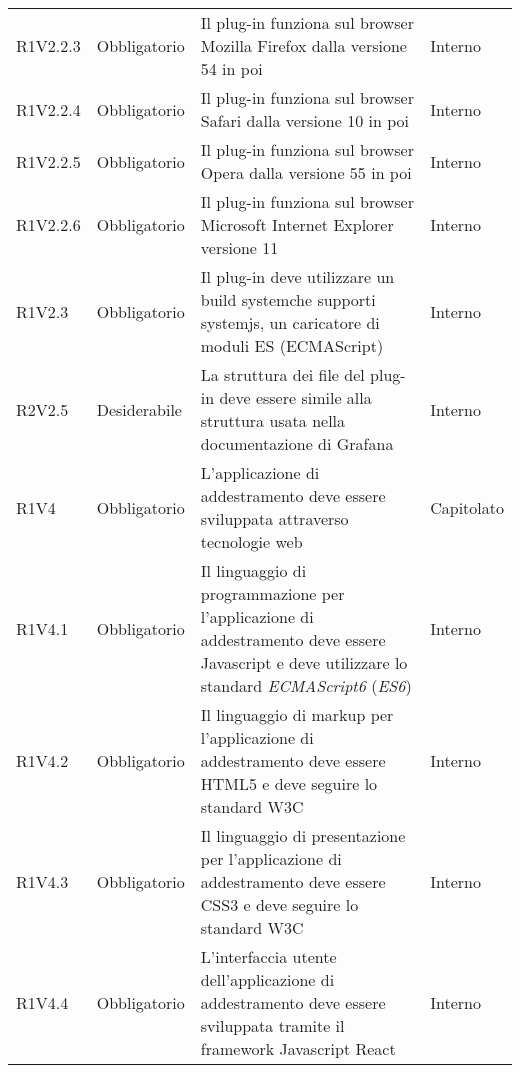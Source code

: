 \begin{longtable} {
		>{\centering}p{18mm} 
		>{\centering}p{28mm}
		>{}p{50mm} 
		>{}p{28mm}
		}
	R1V2.2.3 & 
	Obbligatorio & 
	Il plug-in funziona sul browser Mozilla Firefox dalla versione 54 in poi &
	Interno  \TBstrut \\ [2mm]
	
	R1V2.2.4 & 
	Obbligatorio & 
	Il plug-in funziona sul browser Safari dalla versione 10 in poi &
	Interno  \TBstrut \\ [2mm]
	
	R1V2.2.5 & 
	Obbligatorio & 
	Il plug-in funziona sul browser Opera dalla versione 55 in poi &
	Interno  \TBstrut \\ [2mm]
	
	R1V2.2.6 & 
	Obbligatorio & 
	Il plug-in funziona sul browser Microsoft Internet Explorer versione 11 &
	Interno  \TBstrut \\ [2mm]
	
	R1V2.3 & 
	Obbligatorio & 
	Il plug-in deve utilizzare un build system\glosp che supporti systemjs, un caricatore di moduli ES (ECMAScript) &
	Interno  \TBstrut \\ [2mm]
	
	R2V2.5 &
	Desiderabile &
	La struttura dei file del plug-in deve essere simile alla struttura usata nella documentazione di Grafana\glo &
	Interno  \TBstrut \\ [2mm]
	
	R1V4 & 
	Obbligatorio & 
	L'applicazione di addestramento deve essere sviluppata attraverso tecnologie web &
	Capitolato \TBstrut \\ [2mm]
	
	R1V4.1 & 
	Obbligatorio & 
	Il linguaggio di programmazione per l'applicazione di addestramento deve essere Javascript e deve utilizzare lo standard \textit{ECMAScript6} (\textit{ES6}) &
	Interno  \TBstrut \\ [2mm]
	
	R1V4.2 & 
	Obbligatorio & 
	Il linguaggio di markup per l'applicazione di addestramento deve essere HTML5 e deve seguire lo standard W3C &
	Interno  \TBstrut \\ [2mm]
	
	R1V4.3 & 
	Obbligatorio & 
	Il linguaggio di presentazione per l'applicazione di addestramento deve essere CSS3 e deve seguire lo standard W3C &
	Interno  \TBstrut \\ [2mm]

	R1V4.4 & 
	Obbligatorio & 
	L'interfaccia utente dell'applicazione di addestramento deve essere sviluppata tramite il framework Javascript React &
	Interno  \TBstrut \\ [2mm]


\end{longtable}
